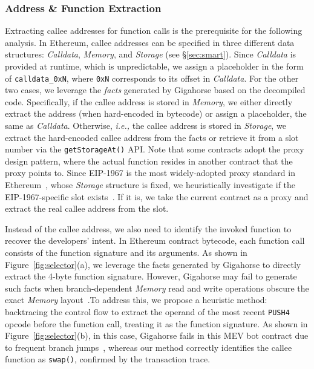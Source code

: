 \subsubsection{Address \& Function Extraction}
\label{method:extractor:address}
\label{method:extractor:function}
Extracting callee addresses for function calls is the prerequisite for the following analysis.
In Ethereum, callee addresses can be specified in three different data structures: \textit{Calldata}, \textit{Memory}, and \textit{Storage} (see \S{\ref{sec:smart}}).
Since \textit{Calldata} is provided at runtime, which is unpredictable, we assign a placeholder in the form of \texttt{calldata\_0xN}, where \texttt{0xN} corresponds to its offset in \textit{Calldata}. For the other two cases, we leverage the \textit{facts} generated by Gigahorse based on the decompiled code. Specifically, if the callee address is stored in \textit{Memory}, we either directly extract the address (when hard-encoded in bytecode) or assign a placeholder, the same as \textit{Calldata}. Otherwise, \textit{i.e.,} the callee address is stored in \textit{Storage}, we extract the hard-encoded callee address from the facts or retrieve it from a slot number via the \texttt{getStorageAt()} API.
Note that some contracts adopt the proxy design pattern, where the actual function resides in another contract that the proxy points to. Since EIP-1967 is the most widely-adopted proxy standard in Ethereum~\cite{eip1967}, whose \textit{Storage} structure is fixed, we heuristically investigate if the EIP-1967-specific slot exists~\cite{openeip}. If it is, we take the current contract as a proxy and extract the real callee address from the slot.


Instead of the callee address, we also need to identify the invoked function to recover the developers' intent. In Ethereum contract bytecode, each function call consists of the function signature and its arguments.
As shown in Figure~\ref{fig:selector}{\color{purple}(a)}, we leverage the facts generated by Gigahorse to directly extract the 4-byte function signature. However, Gigahorse may fail to generate such facts when branch-dependent \textit{Memory} read and write operations obscure the exact \textit{Memory} layout~\cite{grech2019gigahorse, zhang2023bian}.To address this, we propose a heuristic method: backtracing the control flow to extract the operand of the most recent \texttt{PUSH4} opcode before the function call, treating it as the function signature.
As shown in Figure~\ref{fig:selector}{\color{purple}(b)}, in this case, Gigahorse fails in this MEV bot contract due to frequent branch jumps~\cite{akmev}, whereas our method correctly identifies the callee function as \texttt{swap()}, confirmed by the transaction trace.


